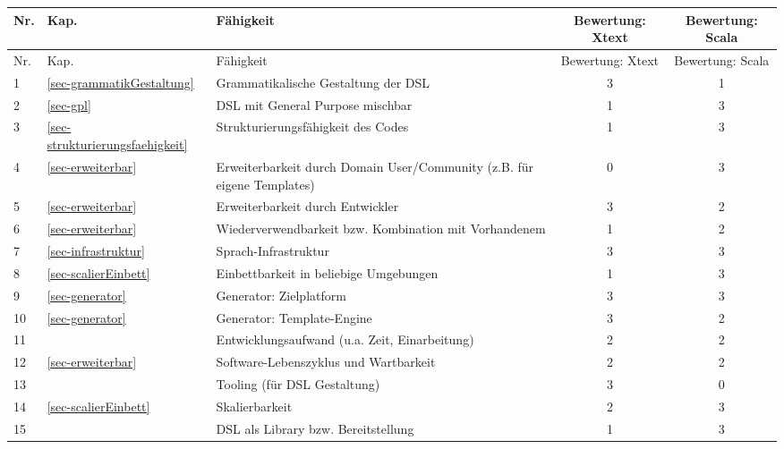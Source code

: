 \begin{longtable}{|p{0.5cm}|p{0.8cm}|p{5cm}|c|c|}

  \hline
  Nr. & Kap. & Fähigkeit & Bewertung: Xtext & Bewertung: Scala \\ \hline \hline
  \endfirsthead

  \hline
  Nr. & Kap. & Fähigkeit & Bewertung: Xtext & Bewertung: Scala \\ \hline
  \endhead

  1
  & \ref{sec-grammatikGestaltung}
  & Grammatikalische Gestaltung der DSL
  & 3
  & 1
  \\\hline

  2
  & \ref{sec-gpl}
  & DSL mit General Purpose mischbar
  & 1
  & 3
  \\\hline

  3
  & \ref{sec-strukturierungsfaehigkeit}
  & Strukturierungsfähigkeit des Codes
  & 1
  & 3
  \\\hline

  4
  & \ref{sec-erweiterbar}
  & Erweiterbarkeit durch Domain User/Community (z.B. für eigene Templates)
  & 0
  & 3
  \\\hline

  5
  & \ref{sec-erweiterbar}
  & Erweiterbarkeit durch Entwickler
  & 3
  & 2
  \\\hline

  6
  & \ref{sec-erweiterbar}
  & Wiederverwendbarkeit bzw. Kombination mit Vorhandenem
  & 1
  & 2
  \\\hline

  7
  & \ref{sec-infrastruktur}
  & Sprach-Infrastruktur
  & 3
  & 3
  \\\hline

  8
  & \ref{sec-scalierEinbett}
  & Einbettbarkeit in beliebige Umgebungen
  & 1
  & 3
  \\\hline

  9
  & \ref{sec-generator}
  & Generator: Zielplatform
  & 3
  & 3
  \\\hline

  10
  & \ref{sec-generator}
  & Generator: Template-Engine
  & 3
  & 2
  \\\hline

  11
  &
  & Entwicklungsaufwand (u.a. Zeit, Einarbeitung)
  & 2
  & 2
  \\\hline

  12
  & \ref{sec-erweiterbar}
  & Software-Lebenszyklus und Wartbarkeit
  & 2
  & 2
  \\\hline

  13
  &
  & Tooling (für DSL Gestaltung)
  & 3
  & 0
  \\\hline

  14
  & \ref{sec-scalierEinbett}
  & Skalierbarkeit
  & 2
  & 3
  \\\hline

  15
  &
  & DSL als Library bzw. Bereitstellung
  & 1
  & 3
  \\\hline

\end{longtable}


